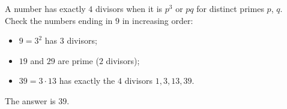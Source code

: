 A number has exactly $4$ divisors when it is $p^3$ or $pq$ for distinct primes $p$, $q$. Check the numbers ending in $9$ in increasing order:
\begin{itemize}
\item $9=3^2$ has $3$ divisors;
\item $19$ and $29$ are prime ($2$ divisors);
\item $39=3\cdot13$ has exactly the $4$ divisors $1,3,13,39$.
\end{itemize}
The answer is $\boxed{39}$.
